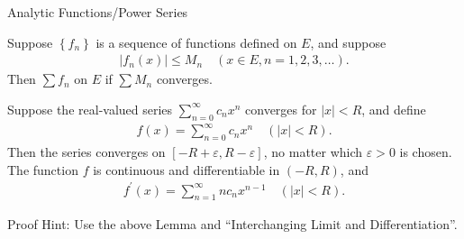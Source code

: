 \documentclass[10pt,xcolor=table,dvipsnames]{beamer}
\begin{document}
\begin{frame}{Analytic Functions/Power Series}
\vspace{-0.3cm}
\begin{Lemma}
  {\small  Suppose $\left\{f_n\right\}$ is a sequence of functions defined on $E$, and suppose
\begin{align*}
\left|f_n(x)\right| \leq M_n \quad(x \in E, n=1,2,3, \ldots) .
\end{align*}
Then $\sum f_n$  on $E$ if $\sum M_n$ converges.}
\end{Lemma}
\pause
\vspace{-0.3cm}
\begin{Theorem}
{\small   Suppose the real-valued series
$\sum_{n=0}^{\infty} c_n x^n$
converges for $|x|<R$, and define
\begin{align}
f(x)=\sum_{n=0}^{\infty} c_n x^n \quad(|x|<R) .
\end{align}
Then the series converges  on $[-R+\varepsilon, R-\varepsilon]$, no matter which $\varepsilon>0$ is chosen. The function $f$ is continuous and differentiable in $(-R, R)$, and
\begin{align}
f^{\prime}(x)=\sum_{n=1}^{\infty} n c_n x^{n-1} \quad(|x|<R) .
\end{align} 
}
\end{Theorem}
{\small Proof Hint: Use the above Lemma and ``Interchanging Limit and Differentiation''.}


\end{frame}
\end{document}
